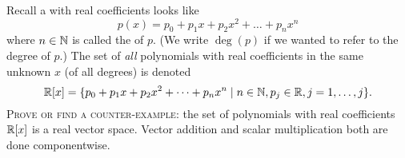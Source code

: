 \begin{exercise}
  Recall a  with real coefficients looks like
  \begin{equation}
p(x) = p_{0} + p_{1}x + p_{2}x^{2} + \dots + p_{n}x^{n}
  \end{equation}
  where $n\in\mathbb{N}$ is called the  of $p$. (We write
  $\deg(p)$ if we wanted to refer to the degree of $p$.) The set of
  \emph{all} polynomials with real coefficients in the same unknown $x$
  (of all degrees) is denoted
  \begin{equation}
\mathbb{R}[x] = \{p_{0} + p_{1}x + p_{2}x^{2} + \dots + p_{n}x^{n}\mid n\in\mathbb{N},
  p_{j}\in\mathbb{R}, j=1,\dots,j\}.
  \end{equation}
  \textsc{Prove or find a counter-example:} the set of polynomials with real
  coefficients $\mathbb{R}[x]$ is a real vector space.
  Vector addition and scalar multiplication both are done componentwise.
\end{exercise}
